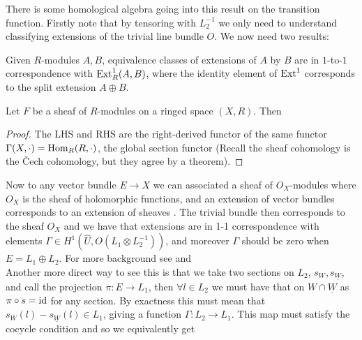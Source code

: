 \documentclass{article}
\begin{document}
\begin{remark}
	There is some homological algebra going into this result on the transition function. Firstly note that by tensoring with $L_2^{-1}$ we only need to understand classifying extensions of the trivial line bundle $O$. We now need two results:
	\begin{lemma}
		Given $R$-modules $A,B$, equivalence classes of extensions of $A$ by $B$ are in $1$-to-$1$ correspondence with $\operatorname{Ext}^1_R(A,B)$, where the identity element of $\operatorname{Ext}^1$ corresponds to the split extension $A \oplus B$. 
	\end{lemma}
	\begin{lemma}
		Let $F$ be a sheaf of $R$-modules on a ringed space $(X,R)$. Then 
	\end{lemma}
\begin{proof}
	The LHS and RHS are the right-derived functor of the same functor $\Gamma(X,\cdot) = \operatorname{Hom}_R(R,\cdot)$, the global section functor (Recall the sheaf cohomology is  the \v{C}ech cohomology, but they agree by a theorem).
\end{proof}
Now to any vector bundle $E \to X$ we can associated a sheaf of $O_X$-modules where $O_X$ is the sheaf of holomorphic functions, and an extension of vector bundles corresponds to an extension of sheaves \cite{Atiyah1957}. The trivial bundle then corresponds to the sheaf $O_X$ and we have that extensions
are in 1-1 correspondence with elements $\Gamma \in H^1(\hat{U},O(L_1\otimes L_2^{-1}))$, and moreover $\Gamma$ should be zero when $E = L_1 \oplus L_2$. For more background see \cite{Atiyah1957a} and \cite{Grothendieck1955} \\
Another more direct way to see this is that we take two sections on $L_2$, $s_W, s_{\underline{W}}$, and call the projection $\pi:E \to L_1$, then $\forall l \in L_2$ we must have that on $W \cap \underline{W}$
as $\pi \circ s = \operatorname{id}$ for any section. By exactness this must mean that $s_W(l) - s_{\underline{W}}(l) \in L_1$, giving a function $\Gamma:L_2 \to L_1$. This map must satisfy the cocycle condition and so we equivalently get 
\begin{comment}
	\eq{
0 \to L_1 \to E \to L_2 \to 0	
}
are classified by $\Ext^1(L_2,L_1)$. By the definition of $\Ext$ we then get the cochain complex
\eq{
0 \to \Hom(L_2,E) \to \Hom(L_2, L_2) \to \dots
}
which gives $\Ext^i$ as the cohomology at the $i^{th}$ point, that is
\eq{
\Ext^1(L_2,L_2) &= \faktor{\ker(\Hom(L_2,E) \to \Hom(L_2, L_2))}{\image(0 \to \Hom(L_2,E))} \\
&=\ker(\Hom(L_2,E) \to \Hom(L_2, L_2))
}
Further we know that $\Hom(L_2,\cdot)$ is an exact functor so we have SES
\eq{
0=\Hom(L_2,0) \to \Hom(L_2,L_1) \to \Hom(L_2,E) \to \Hom(L_2,L_1) \to \Hom(L_2,0) =0
}
This gives that 
\eq{
\ker(\Hom(L_2,E) \to \Hom(L_2, L_2)) \cong \Hom(L_2, L_1) \cong H^1(\hat{U},O(L_1 \otimes L_2^{-1}))
}
\end{comment}
\end{remark}
\end{document}
